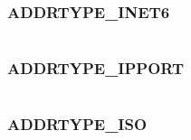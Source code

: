 \documentclass[letterpaper,10pt,english]{sphinxmanual}
\begin{document}
\begin{tabulary}{\linewidth}{|L|L|}
\hline

 & 
\\\hline
\end{tabulary}



\subsubsection{ADDRTYPE\_INET6}
\label{appdev/refs/macros/ADDRTYPE_INET6:addrtype-inet6-data}\label{appdev/refs/macros/ADDRTYPE_INET6:addrtype-inet6}\label{appdev/refs/macros/ADDRTYPE_INET6::doc}

\begin{fulllineitems}
\label{appdev/refs/macros/ADDRTYPE_INET6:ADDRTYPE_INET6}
\end{fulllineitems}


\begin{tabulary}{\linewidth}{|L|L|}
\hline

 & 
\\\hline
\end{tabulary}



\subsubsection{ADDRTYPE\_IPPORT}
\label{appdev/refs/macros/ADDRTYPE_IPPORT:addrtype-ipport}\label{appdev/refs/macros/ADDRTYPE_IPPORT::doc}\label{appdev/refs/macros/ADDRTYPE_IPPORT:addrtype-ipport-data}

\begin{fulllineitems}
\label{appdev/refs/macros/ADDRTYPE_IPPORT:ADDRTYPE_IPPORT}
\end{fulllineitems}


\begin{tabulary}{\linewidth}{|L|L|}
\hline

 & 
\\\hline
\end{tabulary}



\subsubsection{ADDRTYPE\_ISO}
\label{appdev/refs/macros/ADDRTYPE_ISO::doc}\label{appdev/refs/macros/ADDRTYPE_ISO:addrtype-iso}\label{appdev/refs/macros/ADDRTYPE_ISO:addrtype-iso-data}
\end{document}
